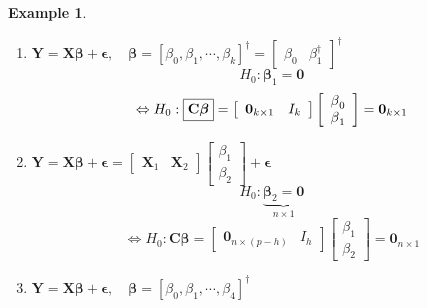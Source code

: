 \documentclass{article}
\newtheorem{example}[theorem]{Example}
\begin{document}
\begin{example}
\begin{enumerate}
\item $\mathbf{Y=X\beta +\epsilon ,\quad \beta =}\left[ \beta _{0},\beta
_{1},\cdots ,\beta _{k}\right] ^{\dagger }=\left[ 
\begin{array}{cc}
\beta _{0} & \beta _{1}^{\dagger }%
\end{array}%
\right] ^{\dagger }$%
\begin{equation*}
H_{0}:\mathbf{\beta }_{1}=\mathbf{0}
\end{equation*}%
\begin{equation*}
\Leftrightarrow H_{0}:\fbox{$\mathbf{C\beta }$}=\left[ 
\begin{array}{cc}
\mathbf{0}_{k\times 1} & I_{k}%
\end{array}%
\right] \left[ 
\begin{array}{c}
\beta _{0} \\ 
\beta _{1}%
\end{array}%
\right] =\mathbf{0}_{k\times 1}
\end{equation*}

\item $\mathbf{Y=X\beta +\epsilon =}\left[ 
\begin{array}{cc}
\mathbf{X}_{1} & \mathbf{X}_{2}%
\end{array}%
\right] \left[ 
\begin{array}{c}
\beta _{1} \\ 
\beta _{2}%
\end{array}%
\right] +\mathbf{\epsilon }$%
\begin{equation*}
H_{0}:\underset{n\times 1}{\underbrace{\mathbf{\beta }_{2}=\mathbf{0}}}
\end{equation*}%
\begin{equation*}
\Leftrightarrow H_{0}:\mathbf{C\beta }=\left[ 
\begin{array}{cc}
\mathbf{0}_{n\times \left( p-h\right) } & I_{h}%
\end{array}%
\right] \left[ 
\begin{array}{c}
\beta _{1} \\ 
\beta _{2}%
\end{array}%
\right] =\mathbf{0}_{n\times 1}
\end{equation*}

\item $\mathbf{Y=X\beta +\epsilon ,\quad \beta =}\left[ \beta _{0},\beta
_{1},\cdots ,\beta _{4}\right] ^{\dagger }$


\end{enumerate}
\end{example}
\end{document}
